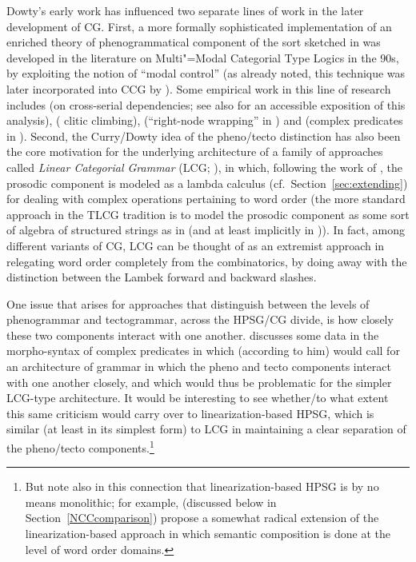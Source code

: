 \documentclass[output=paper,biblatex,babelshorthands,newtxmath,draftmode,colorlinks,citecolor=brown]{langscibook}
\begin{document}
Dowty's early work has influenced two separate lines of work in the
later development of CG. First, a more formally sophisticated
implementation of an enriched theory of phenogrammatical component of
the sort sketched in \citet{Dowty90a-Eng} was developed in the
literature on Multi"=Modal Categorial Type Logics 
in the 90s, by exploiting the notion of ``modal control'' (as
already noted, this technique was  
later incorporated into CCG by \citealt[Chapter~5]{Baldridge2002a-u}). Some empirical
work in this line of research includes \citet{moortgatoehrle94} (on 
cross-serial dependencies; see also \citealt[Section~4]{Dowty97a-u} for an accessible
exposition of this analysis), \citet{kraak98} ( clitic climbing),
\citet{Whitman2009} (``right-node wrapping'' in ) and
\citet{kubota-diss,Kubota2014a-u} (complex predicates in ). Second,
the Curry/Dowty idea of the pheno/tecto distinction has also been the core motivation for the
underlying architecture of
a family of approaches called \emph{Linear Categorial Grammar} (LCG;
\citealt{oehrle1994,degroote01,muskens03,mihalicek-pollard10,pollard13}),
in which, following the work of \citet{oehrle1994},
the prosodic component is modeled as a lambda calculus
(cf.\ Section~\ref{sec:extending}) for
dealing with complex operations pertaining to word order
(the more standard approach in the TLCG tradition is to model the
prosodic component as some sort of algebra of structured strings as in
\citealt{morrill-ea11} (and at least implicitly in \citealt[Section~4]{moortgat1997})). 
In fact, among different variants of  
CG, LCG can be thought of as an extremist approach in
relegating word order completely from the combinatorics, by
doing away with the distinction between the Lambek forward and backward slashes.

One issue that arises for approaches that distinguish between the
levels of phenogrammar and tectogrammar, across the HPSG/CG divide, is
how closely these two components interact with one another.
\citet[Section~2.3]{Kubota2014a-u} discusses some data in the morpho-syntax of
complex predicates in  which (according to him) would call for
an architecture of grammar in which the pheno and tecto components
interact with one another closely, and which would thus be problematic
for the simpler LCG-type architecture. It would be interesting to see
whether/to what extent this same criticism would carry over to
linearization-based HPSG, which is similar (at least in its simplest
form) to LCG in maintaining a clear separation of the pheno/tecto
components.\footnote{But note also in this connection that
linearization-based HPSG is by no means monolithic; for example,
\citet{yatabe-tam2017} (discussed below in
Section~\ref{NCCcomparison}) propose a somewhat radical extension of
the linearization-based approach in which semantic composition is done at
the level of word order domains.}
\end{document}
